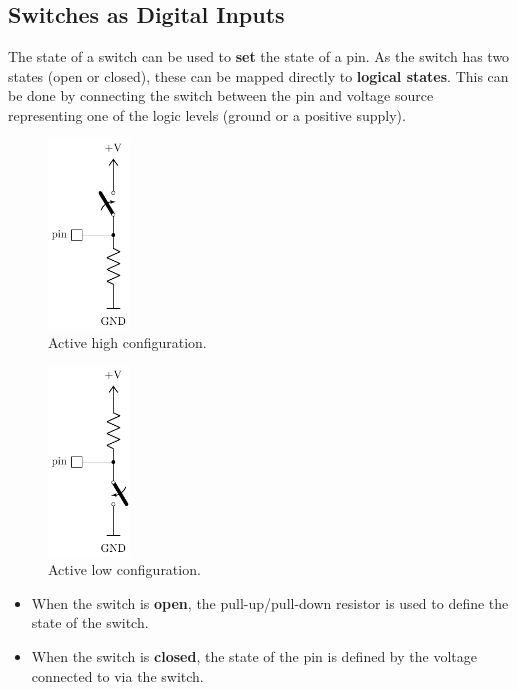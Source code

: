 \documentclass{report}
\begin{document}
\subsection{Switches as Digital Inputs}
The state of a switch can be used to \textbf{set} the state of a pin.
As the switch has two states (open or closed), these can be mapped directly to
\textbf{logical states}.
This can be done by connecting the switch between the pin and voltage source
representing one of the logic levels (ground or a positive supply).
\pagebreak
\begin{multicols}{2}
    \begin{figure}[H]
        \centering
        \includegraphics[height = 5cm, keepaspectratio = true]{figures/active_high_switch.pdf}
        \caption{Active high configuration.} %
    \end{figure}
    \begin{figure}[H]
        \centering
        \includegraphics[height = 5cm, keepaspectratio = true]{figures/active_low_switch.pdf}
        \caption{Active low configuration.} %
    \end{figure}
\end{multicols}
\begin{itemize}
    \item When the switch is \textbf{open}, the pull-up/pull-down resistor is used to define the state of the switch.
    \item When the switch is \textbf{closed}, the state of the pin is defined by the voltage connected to via the switch.
\end{itemize}
\end{document}
